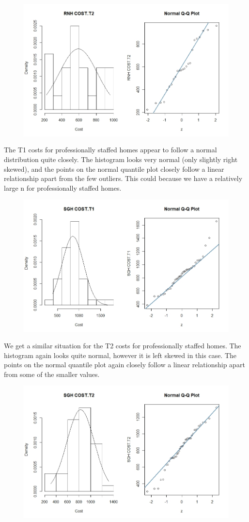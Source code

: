 \documentclass[]{article}
\begin{document}
\begin{figure}[H]
\centering
\includegraphics[width=12cm]{RStudio/jpeg/Norm_RNH_T2.jpeg}
\end{figure}
\newpage
The T1 costs for professionally staffed homes appear to follow a normal distribution quite closely. The histogram looks very normal (only slightly right skewed), and the points on the normal quantile plot closely follow a linear relationship apart from the few outliers. This could because we have a relatively large n for professionally staffed homes.
\begin{figure}[H]
\centering
\includegraphics[width=12cm]{RStudio/jpeg/Norm_SGH_T1.jpeg}
\end{figure}
We get a similar situation for the T2 costs for professionally staffed homes. The histogram again looks quite normal, however it is left skewed in this case. The points on the normal quantile plot again closely follow a linear relationship apart from some of the smaller values.
\begin{figure}[H]
\centering
\includegraphics[width=12cm]{RStudio/jpeg/Norm_SGH_T2.jpeg}
\end{figure}
\end{document}
